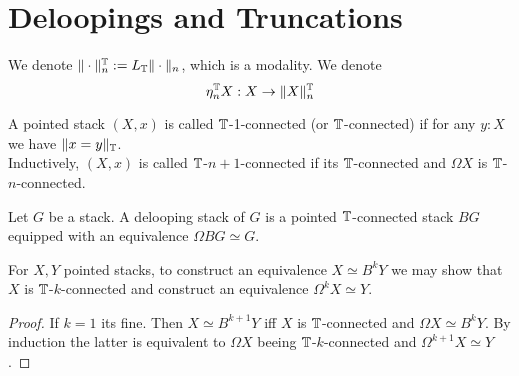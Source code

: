 
\section{Deloopings and Truncations}

We denote $\| \cdot \|_n^{\mathbb{T}} := L_{\mathbb{T}} \| \cdot \|_n$, which is a modality. We denote 
\[
\eta_n^{\mathbb{T}} X : X \to \| X\|_n^{\mathbb{T}}
\]
\begin{definition}
	A pointed stack $(X,x)$ is called $\mathbb{T}$-1-connected (or $\mathbb{T}$-connected) if for any $y : X$ we have $\|x = y\|_{\mathbb{T}}$. \\
	Inductively, $(X,x)$ is called $\mathbb{T}$-$n+1$-connected if its $\mathbb{T}$-connected and $\Omega X$ is $\mathbb{T}$-$n$-connected.
\end{definition}
\begin{definition}
	Let $G$ be a stack. A delooping stack of $G$ is a  pointed $\mathbb{T}$-connected stack $B G$ equipped with an equivalence $\Omega B G \simeq G$.
\end{definition}
\begin{lemma}{\label{lemma:detectDelooping}}
	For $X,Y$ pointed stacks, to construct an equivalence $X \simeq B^k Y$ we may show that $X$ is $\mathbb{T}$-$k$-connected and construct an equivalence $\Omega^k X \simeq Y$.
\end{lemma}
\begin{proof}
	If $k = 1$ its fine. Then $X \simeq B^{k+1} Y$ iff $X$ is $\mathbb{T}$-connected and $\Omega X \simeq B^k Y$. By induction the latter is equivalent to $\Omega X$ beeing $\mathbb{T}$-$k$-connected and $\Omega^{k+1} X \simeq Y$.
\end{proof}

